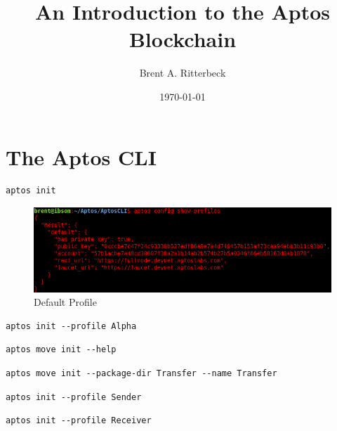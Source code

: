 \documentclass[12pt]{book}
\title{An Introduction to the Aptos Blockchain}
\author{Brent A. Ritterbeck}
\date{\today}
\theoremstyle{definition}
\theoremstyle{plain}
\begin{document}
\maketitle

\chapter{The Aptos CLI}

\begin{lstlisting}[caption={Creating a Default Profile}]
aptos init
\end{lstlisting}

\begin{figure}[htp]
\centering
\includegraphics[scale=0.50]{./images/default_profile.png}
\caption{Default Profile}
\end{figure}

\begin{lstlisting}[caption={Creating a Named Profile}]
aptos init --profile Alpha
\end{lstlisting}

\begin{lstlisting}[caption={Show Initial Project Options}]
aptos move init --help
\end{lstlisting}

\begin{lstlisting}[caption={Create Project Shell}]
aptos move init --package-dir Transfer --name Transfer
\end{lstlisting}

\begin{lstlisting}[caption={Create Sender Profile}]
aptos init --profile Sender
\end{lstlisting}

\begin{lstlisting}[caption={Create Receiver Profile}]
aptos init --profile Receiver
\end{lstlisting}
\end{document}
